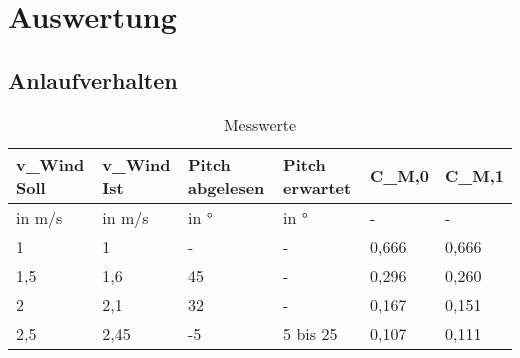 \section{Auswertung}
\label{sec:Auswertung}
\subsection{Anlaufverhalten}
\begin{table}[ht!]
    \centering
    \caption{Messwerte}
    \label{tab_Messwerte_Anlauf_230615}
    \begin{tabular}{|l|l|l|l|l|l|}
    \hline
    \rowcolor[HTML]{70AD47} 
    {\color[HTML]{FFFFFF} \textbf{v\_Wind   Soll}} & {\color[HTML]{FFFFFF} \textbf{v\_Wind Ist}} & {\color[HTML]{FFFFFF} \textbf{Pitch abgelesen}} & {\color[HTML]{FFFFFF} \textbf{Pitch erwartet}} & {\color[HTML]{FFFFFF} \textbf{C\_M,0}} & {\color[HTML]{FFFFFF} \textbf{C\_M,1}} \\ \hline
    \rowcolor[HTML]{70AD47} 
    in m/s                                         & in m/s                                      & in °                                            & in °                                           & -                                      & -                                      \\ \hline
    \rowcolor[HTML]{E2EFDA} 
    1                                              & 1                                           & -                                               & -                                              & 0,666                                  & 0,666                                  \\ \hline
    \rowcolor[HTML]{C6E0B4} 
    1,5                                            & 1,6                                         & 45                                              & -                                              & 0,296                                  & 0,260                                  \\ \hline
    \rowcolor[HTML]{E2EFDA} 
    2                                              & 2,1                                         & 32                                              & -                                              & 0,167                                  & 0,151                                  \\ \hline
    \rowcolor[HTML]{C6E0B4} 
    2,5                                            & 2,45                                        & -5                                              & 5 bis 25                                       & 0,107                                  & 0,111                                  \\ \hline
    \end{tabular}
    \end{table}

